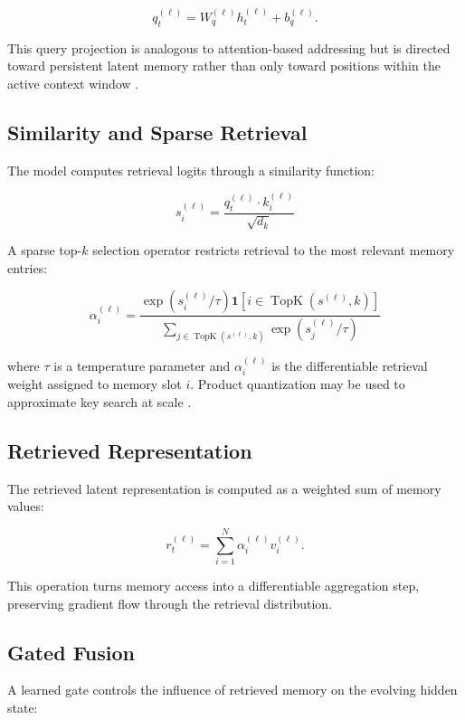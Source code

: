 \begin{equation}
q_t^{(\ell)} = W_q^{(\ell)} h_t^{(\ell)} + b_q^{(\ell)}.
\end{equation}

This query projection is analogous to attention-based addressing but is directed toward persistent latent memory rather than only toward positions within the active context window \cite{Bahdanau2016,Vaswani2017}.

\subsection{Similarity and Sparse Retrieval}
The model computes retrieval logits through a similarity function:

\begin{equation}
s_i^{(\ell)} = \frac{q_t^{(\ell)} \cdot k_i^{(\ell)}}{\sqrt{d_k}}
\end{equation}

A sparse top-$k$ selection operator restricts retrieval to the most relevant memory entries: 

\begin{equation}
\alpha_i^{(\ell)} = \frac{\exp(s_i^{(\ell)}/\tau)\mathbf{1}[i \in \operatorname{TopK}(s^{(\ell)}, k)]}{\sum_{j \in \operatorname{TopK}(s^{(\ell)}, k)} \exp(s_j^{(\ell)}/\tau)}
\end{equation}

where $\tau$ is a temperature parameter and $\alpha_i^{(\ell)}$ is the differentiable retrieval weight assigned to memory slot $i$. Product quantization may be used to approximate key search at scale \cite{Jgou2011,Johnson2021}.

\subsection{Retrieved Representation}
The retrieved latent representation is computed as a weighted sum of memory values:

\begin{equation}
r_t^{(\ell)} = \sum_{i=1}^{N} \alpha_i^{(\ell)} v_i^{(\ell)}.
\end{equation} 

This operation turns memory access into a differentiable aggregation step, preserving gradient flow through the retrieval distribution.

\subsection{Gated Fusion}
A learned gate controls the influence of retrieved memory on the evolving hidden state:

